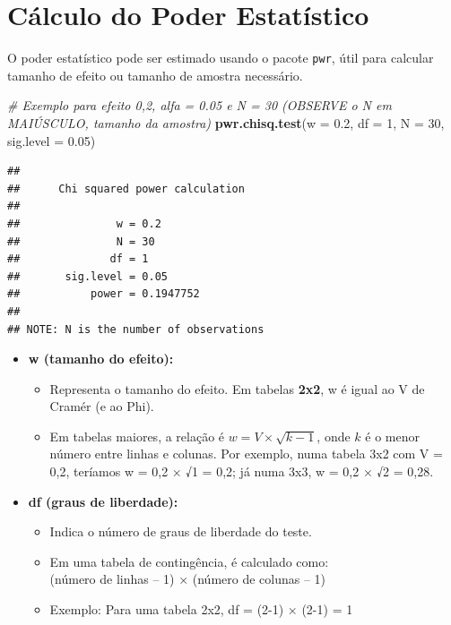 \documentclass[
]{book}
\newenvironment{Shaded}{\begin{snugshade}}{\end{snugshade}}
\newcommand{\AttributeTok}[1]{\textcolor[rgb]{0.13,0.29,0.53}{#1}}
\newcommand{\CommentTok}[1]{\textcolor[rgb]{0.56,0.35,0.01}{\textit{#1}}}
\newcommand{\DecValTok}[1]{\textcolor[rgb]{0.00,0.00,0.81}{#1}}
\newcommand{\FloatTok}[1]{\textcolor[rgb]{0.00,0.00,0.81}{#1}}
\newcommand{\FunctionTok}[1]{\textcolor[rgb]{0.13,0.29,0.53}{\textbf{#1}}}
\newcommand{\NormalTok}[1]{#1}
\providecommand{\tightlist}{%
  \setlength{\itemsep}{0pt}\setlength{\parskip}{0pt}}
\begin{document}
\section{Cálculo do Poder Estatístico}\label{cuxe1lculo-do-poder-estatuxedstico}

O poder estatístico pode ser estimado usando o pacote \texttt{pwr}, útil para calcular tamanho de efeito ou tamanho de amostra necessário.

\begin{Shaded}
\begin{Highlighting}[]
\CommentTok{\# Exemplo para efeito 0,2, alfa = 0.05 e N = 30 (OBSERVE o N em MAIÚSCULO, tamanho da amostra)}
\FunctionTok{pwr.chisq.test}\NormalTok{(}\AttributeTok{w =} \FloatTok{0.2}\NormalTok{, }\AttributeTok{df =} \DecValTok{1}\NormalTok{, }\AttributeTok{N =} \DecValTok{30}\NormalTok{, }\AttributeTok{sig.level =} \FloatTok{0.05}\NormalTok{)}
\end{Highlighting}
\end{Shaded}

\begin{verbatim}
## 
##      Chi squared power calculation 
## 
##               w = 0.2
##               N = 30
##              df = 1
##       sig.level = 0.05
##           power = 0.1947752
## 
## NOTE: N is the number of observations
\end{verbatim}

\begin{itemize}
\tightlist
\item
  \textbf{w (tamanho do efeito):}

  \begin{itemize}
  \tightlist
  \item
    Representa o tamanho do efeito. Em tabelas \textbf{2x2}, w é igual ao V de Cramér (e ao Phi).
  \item
    Em tabelas maiores, a relação é \(w = V \times \sqrt{k - 1}\), onde \(k\) é o menor número entre linhas e colunas. Por exemplo, numa tabela 3x2 com V = 0,2, teríamos w = 0,2 × √1 = 0,2; já numa 3x3, w = 0,2 × √2 = 0,28.
  \end{itemize}
\item
  \textbf{df (graus de liberdade):}

  \begin{itemize}
  \tightlist
  \item
    Indica o número de graus de liberdade do teste.
  \item
    Em uma tabela de contingência, é calculado como:\\
    (número de linhas -- 1) × (número de colunas -- 1)
  \item
    Exemplo: Para uma tabela 2x2, df = (2-1) × (2-1) = 1
  \end{itemize}
\end{itemize}
\end{document}
